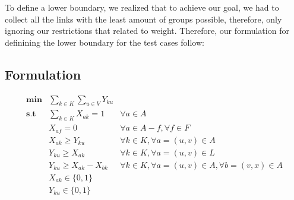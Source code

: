 To define a lower boundary, we realized that to achieve our goal, we had to collect all the links with the least amount of groups possible, therefore, only ignoring our restrictions that related to weight. Therefore, our formulation for definining the lower boundary for the test cases follow:

\subsection{Formulation}

\begin{align*}
    \mathbf{min} &\sum_{k\in K} \sum_{u \in V} {Y_{ku}} \\
   \mathbf{s.t}  &\sum_{k \in K}{X_{ak}=1} & \forall a \in A\\
        &X_{af} = 0 & \forall a \in A - f,  \forall f \in F\\
        &X_{ak} \geq Y_{ku} & \forall k \in K, \forall a = (u,v) \in A \\
        &Y_{ku} \geq X_{ak} & \forall k \in K, \forall a = (u,v) \in L \\
        &Y_{ku} \geq X_{ak} - X_{bk} & \forall k \in K, \forall a = (u,v) \in A, \forall b = (v,x) \in A \\
        &X_{ak} \in \{0,1\} \\
        &Y_{ku} \in \{0,1\}
\end{align*}